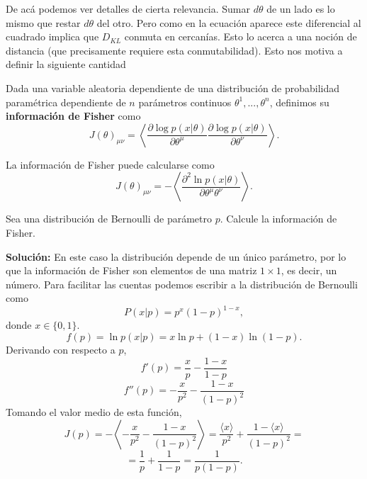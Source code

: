 De ac\'a podemos ver detalles de cierta relevancia. Sumar $d\theta$ de un lado es lo mismo que restar $d\theta$ del otro. Pero como en la ecuaci\'on aparece este diferencial al cuadrado implica que $D_{KL}$ conmuta en cercan\'ias. Esto lo acerca a una noci\'on de distancia (que precisamente requiere esta conmutabilidad). Esto nos motiva a definir la siguiente cantidad
\begin{definition}
    Dada una variable aleatoria dependiente de una distribuci\'on de probabilidad param\'etrica  dependiente de $n$ par\'ametros continuos $\theta^1,...,\theta^n$, definimos su {\bf informaci\'on de Fisher} como
    \begin{equation}
        J(\theta)_{\mu\nu} = \left\langle \frac{\partial \log p(x|\theta)}{\partial \theta^\mu}
        \frac{\partial \log p(x|\theta)}{\partial \theta^\nu}
        \right\rangle.
    \end{equation}
\end{definition}
\begin{theorem}
    La informaci\'on de Fisher puede calcularse como
    \begin{equation}
        J(\theta)_{\mu\nu}= -\left\langle 
            \frac{\partial^2 \ln p(x|\theta)}{\partial \theta^\mu\theta^\nu}
        \right\rangle.
    \end{equation}
\end{theorem}

\begin{example}
    Sea una distribuci\'on de Bernoulli de par\'ametro $p$. Calcule la informaci\'on de Fisher.
    
    {\bf Soluci\'on:} En este caso la distribuci\'on depende de un \'unico par\'ametro, por lo que la informaci\'on de Fisher son elementos de una matriz $1\times 1$, es decir, un n\'umero. Para facilitar las cuentas podemos escribir a la distribuci\'on de Bernoulli como
    $$
        P(x|p) = p^{x}(1-p)^{1-x},
    $$
    donde $x\in\{0,1\}$.
    $$
        f(p)=\ln p(x|p) = x \ln p + (1-x) \ln (1-p).
    $$
    Derivando con respecto a $p$,
    $$
        f'(p) = \frac{x}{p} - \frac{1-x}{1-p}
    $$
    $$
        f''(p) = -\frac{x}{p^2} - \frac{1-x}{(1-p)^2}
    $$
    Tomando el valor medio de esta funci\'on,
    $$
        J(p) = -\left\langle -\frac{x}{p^2} - \frac{1-x}{(1-p)^2}\right\rangle = \frac{\langle x\rangle}{p^2} + \frac{1-\langle x\rangle}{(1-p)^2}=
    $$
    $$
        = \frac{1}{p} + \frac{1}{1-p} = \frac{1}{p(1-p)}.
    $$
\end{example}

